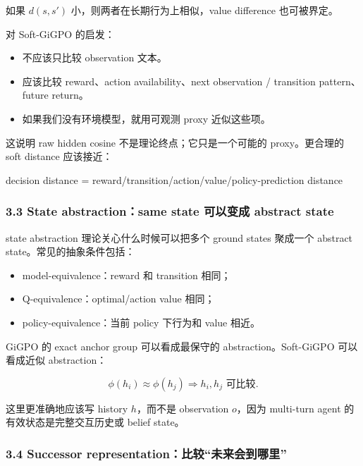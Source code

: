 \documentclass[
  10pt,
]{ctexart}
\newenvironment{Shaded}{}{}
\newcommand{\NormalTok}[1]{#1}
\providecommand{\tightlist}{%
  \setlength{\itemsep}{0pt}\setlength{\parskip}{0pt}}
\begin{document}
如果 \(d(s,s')\) 小，则两者在长期行为上相似，value difference
也可被界定。

对 Soft-GiGPO 的启发：

\begin{itemize}
\tightlist
\item
  不应该只比较 observation 文本。
\item
  应该比较 reward、action availability、next observation / transition
  pattern、future return。
\item
  如果我们没有环境模型，就用可观测 proxy 近似这些项。
\end{itemize}

这说明 raw hidden cosine 不是理论终点；它只是一个可能的 proxy。更合理的
soft distance 应该接近：

\begin{Shaded}
\begin{Highlighting}[]
\NormalTok{decision distance = reward/transition/action/value/policy{-}prediction distance}
\end{Highlighting}
\end{Shaded}

\subsubsection{3.3 State abstraction：same state 可以变成 abstract
state}\label{state-abstractionsame-state-ux53efux4ee5ux53d8ux6210-abstract-state}

state abstraction 理论关心什么时候可以把多个 ground states 聚成一个
abstract state。常见的抽象条件包括：

\begin{itemize}
\tightlist
\item
  model-equivalence：reward 和 transition 相同；
\item
  Q-equivalence：optimal/action value 相同；
\item
  policy-equivalence：当前 policy 下行为和 value 相近。
\end{itemize}

GiGPO 的 exact anchor group 可以看成最保守的 abstraction。Soft-GiGPO
可以看成近似 abstraction：

\[
\phi(h_i) \approx \phi(h_j)
\Rightarrow
h_i,h_j \text{ 可比较}.
\]

这里更准确地应该写 history \(h\)，而不是 observation \(o\)，因为
multi-turn agent 的有效状态是完整交互历史或 belief state。

\subsubsection{3.4 Successor
representation：比较``未来会到哪里''}\label{successor-representationux6bd4ux8f83ux672aux6765ux4f1aux5230ux54eaux91cc}
\end{document}
